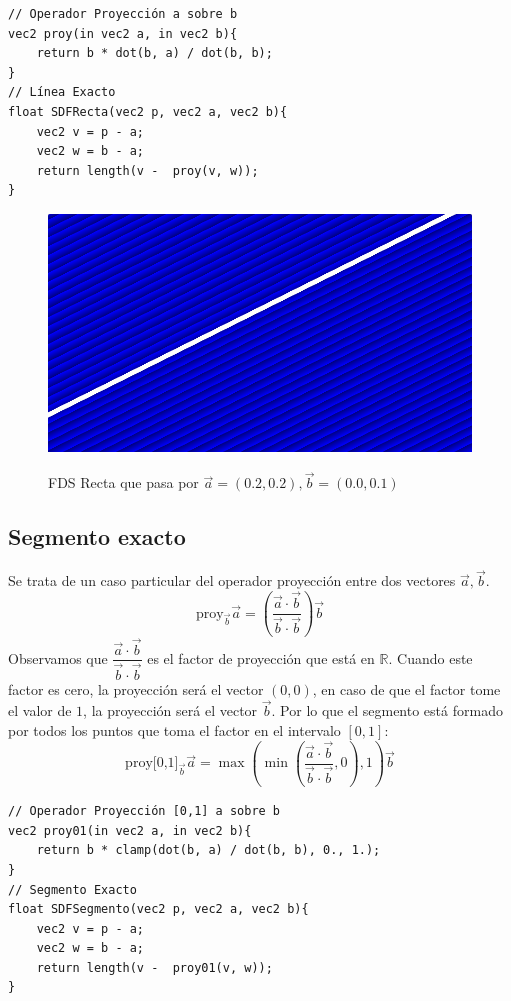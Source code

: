 \begin{lstlisting}
// Operador Proyección a sobre b
vec2 proy(in vec2 a, in vec2 b){
    return b * dot(b, a) / dot(b, b);
}
// Línea Exacto
float SDFRecta(vec2 p, vec2 a, vec2 b){
    vec2 v = p - a;
    vec2 w = b - a;
    return length(v -  proy(v, w));
}
\end{lstlisting}
\begin{figure}[H]
  \centering
  \captionsetup{justification=centering}%
  \includegraphics[width=1.0\textwidth]{secciones/imagenes/sdf/2d/sdf_recta.png}\label{fig:recta}
  \caption{FDS Recta que pasa por \(\Vec{a}=(0.2, 0.2), \Vec{b}=(0.0, 0.1)\)}
\end{figure}

\subsection{Segmento exacto}
Se trata de un caso particular del operador proyección entre dos vectores \(\Vec{a}, \Vec{b}\). 
\[ \text{proy}_{\Vec{b}}\Vec{a}=\left(\dfrac{\Vec{a}\cdot \Vec{b}}{\Vec{b}\cdot \Vec{b}}\right)\Vec{b}\]
Observamos que \(\dfrac{\Vec{a}\cdot \Vec{b}}{\Vec{b}\cdot \Vec{b}}\) es el factor de proyección que está en \(\mathbb{R}\). Cuando este factor es cero, la proyección será el vector \((0,0)\), en caso de que el factor tome el valor de \(1\), la proyección será el vector \(\Vec{b}\). Por lo que el segmento está formado por todos los puntos que toma el factor en el intervalo \([0,1]\):
\[ \text{proy[0,1]}_{\Vec{b}}\Vec{a}=\max\left(\min\left(\dfrac{\Vec{a}\cdot \Vec{b}}{\Vec{b}\cdot \Vec{b}}, 0\right), 1\right)\Vec{b}\]

\begin{lstlisting}
// Operador Proyección [0,1] a sobre b
vec2 proy01(in vec2 a, in vec2 b){
    return b * clamp(dot(b, a) / dot(b, b), 0., 1.);
}
// Segmento Exacto
float SDFSegmento(vec2 p, vec2 a, vec2 b){
    vec2 v = p - a;
    vec2 w = b - a;
    return length(v -  proy01(v, w));
}
\end{lstlisting}

